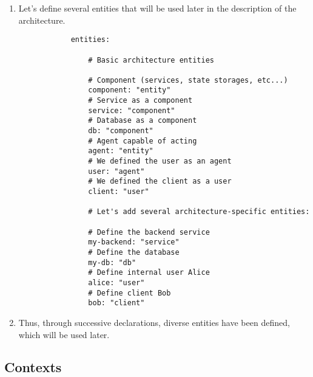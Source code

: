 \documentclass[final]{article}
\begin{document}
        \begin{enumerate}
            \item Let's define several entities that will be used later in the description of the architecture.

            \begin{verbatim}
            entities:

                # Basic architecture entities

                # Component (services, state storages, etc...)
                component: "entity"
                # Service as a component
                service: "component"
                # Database as a component
                db: "component"
                # Agent capable of acting
                agent: "entity"
                # We defined the user as an agent
                user: "agent"
                # We defined the client as a user
                client: "user"

                # Let's add several architecture-specific entities:

                # Define the backend service
                my-backend: "service"
                # Define the database
                my-db: "db"
                # Define internal user Alice
                alice: "user"
                # Define client Bob
                bob: "client"

            \end{verbatim}

            \item Thus, through successive declarations, diverse entities have been defined, which will be used later.

        \end{enumerate}

    \subsection{Contexts}
\end{document}
